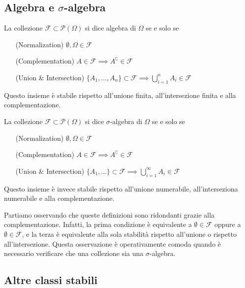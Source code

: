 \subsection{Algebra e $\sigma$-algebra}

\begin{my_definition}
	La collezione $\mathcal{F} \subset \mathcal{P}(\Omega)$ si dice algebra di $\Omega$ se e solo se
	\begin{itemize}
	   	\item[(Normalization)] $\emptyset, \Omega \in \mathcal{F}$
	    	\item[(Complementation)] $A \in \mathcal{F} \implies A^\complement \in \mathcal{F}$
	    	\item[(Union \& Intersection)] $\{A_1, \dots, A_n\} \subset \mathcal{F} \implies \bigcup_{i=1}^{n} A_i \in \mathcal{F}$
	\end{itemize}
\end{my_definition}
    
Questo insieme è stabile rispetto all'unione finita, all'intersezione finita e alla complementazione.
    
\begin{my_definition}
	La collezione $\mathcal{F} \subset \mathcal{P}(\Omega)$ si dice $\sigma$-algebra di $\Omega$ se e solo se
	\begin{itemize}
	    	\item[(Normalization)] $\emptyset, \Omega \in \mathcal{F}$
	    	\item[(Complementation)] $A \in \mathcal{F} \implies A^\complement \in \mathcal{F}$
	    	\item[(Union \& Intersection)] $\{A_1, \dots\} \subset \mathcal{F} \implies \bigcup_{i=1}^{\infty} A_i \in \mathcal{F}$
	\end{itemize}
\end{my_definition}

Questo insieme è invece stabile rispetto all'unione numerabile, all'interseziona numerabile e alla complementazione.

Partiamo osservando che queste definizioni sono ridondanti grazie alla complementazione. Infatti, la prima condizione è equivalente a $\emptyset\in\mathcal{F}$ oppure a $\emptyset\in\mathcal{F}$, e la terza è equivalente alla sola stabilità rispetto all'unione o rispetto all'intersezione. Questa osservazione è operativamente comoda quando è necessario verificare che una collezione sia una $\sigma$-algebra.

\subsection{Altre classi stabili}

